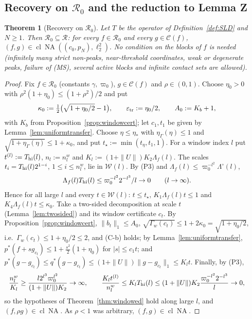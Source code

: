 \documentclass[10pt]{amsart}
\newtheorem{theorem}{Theorem}[section]
\theoremstyle{definition}
\theoremstyle{remark}
\newcommand{\NA}{\operatorname{NA}}
\newcommand{\Cset}{\mathcal C}
\newcommand{\cl}{\operatorname{cl}}
\newcommand{\Rec}{\mathcal R}
\begin{document}
\subsection{Recovery on $\mathcal R_0$ and the reduction to Lemma Z}

\begin{theorem}[Recovery on $\mathcal R_0$]\label{thm:R0}
Let $T$ be the operator of Definition~\ref{def:SLD} and $N\ge1$.  Then
$\mathcal R_0\subseteq\Rec$: for every $f\in\mathcal R_0$ and every
$g\in\Cset(f)$, $(f,g)\in\cl\NA((c_0,p_N),\ell_2^2)$.  No condition on the
blocks of $f$ is needed \textup{(}infinitely many strict non-peaks,
near-threshold coordinates, weak or degenerate peaks, failure of
\textup{(MS)}, several active blocks and infinite contact sets are
allowed\textup{)}.
\end{theorem}

\begin{proof}
Fix $f\in\mathcal R_0$ (constants $\gamma,\varpi_0$), $g\in\Cset(f)$ and
$\rho\in(0,1)$.  Choose $\eta_0>0$ with $\rho^2(1+\eta_0)\le(1+\rho^2)/2$ and
put
\[
 \kappa_0:=\tfrac12\big(\sqrt{1+\eta_0/2}-1\big),\qquad
 \varepsilon_{\rm tr}:=\eta_0/2,\qquad A_0:=K_b+1,
\]
with $K_b$ from Proposition~\ref{prop:windowcert}; let $c_1,t_1$ be given by
Lemma~\ref{lem:uniformtransfer}.  Choose $\eta\le\eta_*$ with
$\eta_\Gamma(\eta)\le1$ and $\sqrt{1+\eta_\Gamma(\eta)}\le1+\kappa_0$, and put
$t_\star:=\min(t_\eta,t_1,1)$.  For a window index $l$ put $t^{(l)}:=
T_{\rm hi}(l)$, $n_l:=n^w_l$ and $K_l:=(1+\|U\|)K_2\Lambda_f(l)$.  The scales
$t_i=T_{\rm hi}(l)2^{1-i}$, $1\le i\le n^w_l$, lie in $\mathcal W(l)$.  By
(P3) and $\Lambda_f(l)\le\varpi_0^{-l^2}\Lambda^\circ(l)$,
\[
 \Lambda_f(l)T_{\rm hi}(l)\le\varpi_0^{-l^2}2^{-l^3}/l\to0\qquad(l\to\infty).
\]
Hence for all large $l$ and every $t\in\mathcal W(l)$: $t\le t_\star$,
$K_1\Lambda_f(l)t\le1$ and $K_4\Lambda_f(l)t\le\kappa_0$.  Take a two-sided
decomposition at scale $t$ (Lemma~\ref{lem:twosided}) and its window
certificate $c_t$.  By Proposition~\ref{prop:windowcert},
$\|b_t\|_1\le A_0$, $\sqrt{\Gamma_w(c_t)}\le1+2\kappa_0=\sqrt{1+\eta_0/2}$,
i.e.\ $\Gamma_w(c_t)\le1+\eta_0/2\le2$, and (C-b) holds; by
Lemma~\ref{lem:uniformtransfer}, $p^*(f+sg_{c_t})\le1+\frac{s^2}2(1+\eta_0)$
for $|s|\le c_1t$; and $p^*(g-g_{c_t})\le q^*(g-g_{c_t})\le(1+\|U\|)
\|g-g_{c_t}\|_1\le K_lt$.  Finally, by (P3),
\[
 \frac{n^w_l}{K_l}\ge\frac{l2^{l^3}\varpi_0^{l^2}}{(1+\|U\|)K_2}\to\infty,
 \qquad\frac{K_lt^{(l)}}{n^w_l}\le K_lT_{\rm hi}(l)\le(1+\|U\|)K_2
 \frac{\varpi_0^{-l^2}2^{-l^3}}l\to0,
\]
so the hypotheses of Theorem~\ref{thm:windowed} hold along large $l$, and
$(f,\rho g)\in\cl\NA$.  As $\rho<1$ was arbitrary, $(f,g)\in\cl\NA$.
\end{proof}
\end{document}
